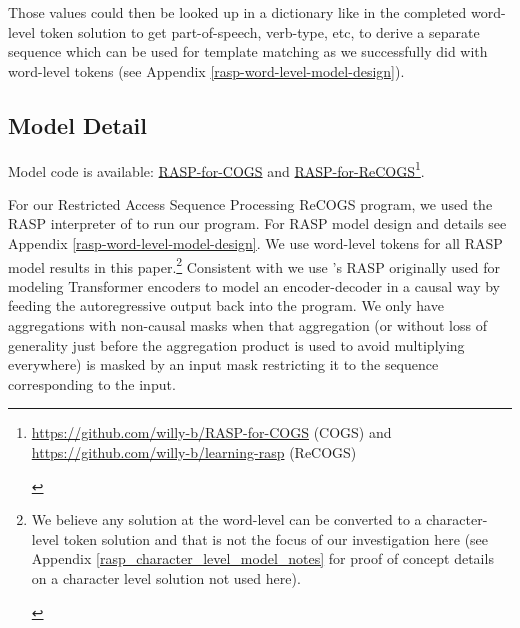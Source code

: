 \documentclass[11pt]{article}
\begin{document}
Those values could then be looked up in a dictionary like in the completed word-level token solution to get part-of-speech, verb-type, etc, to derive a separate sequence which can be used for template matching as we successfully did with word-level tokens (see Appendix \ref{rasp-word-level-model-design}).

\clearpage
\subsection{Model Detail}
\label{model_detail}
Model code is available: \href{https://github.com/willy-b/RASP-for-COGS}{RASP-for-COGS} and \href{https://github.com/willy-b/learning-rasp}{RASP-for-ReCOGS}\footnote{\begin{footnotesize}\href{https://github.com/willy-b/RASP-for-COGS}{https://github.com/willy-b/RASP-for-COGS} (COGS) and \href{https://github.com/willy-b/learning-rasp}{https://github.com/willy-b/learning-rasp} (ReCOGS)\end{footnotesize}}.

For our Restricted Access Sequence Processing ReCOGS program, we used the RASP interpreter of \citep{Weiss2021} to run our program. For RASP model design and details see Appendix \ref{rasp-word-level-model-design}. We use word-level tokens for all RASP model results in this paper.\footnote{\begin{footnotesize}We believe any solution at the word-level can be converted to a character-level token solution and that is not the focus of our investigation here (see Appendix \ref{rasp_character_level_model_notes} for proof of concept details on a character level solution not used here).\end{footnotesize}}
Consistent with \citep{Zhou2024} we use \citep{Weiss2021}'s RASP originally used for modeling Transformer encoders to model an encoder-decoder in a causal way by feeding the autoregressive output back into the program. We only have aggregations with non-causal masks when that aggregation (or without loss of generality just before the aggregation product is used to avoid multiplying everywhere) is masked by an input mask restricting it to the sequence corresponding to the input.
\end{document}
